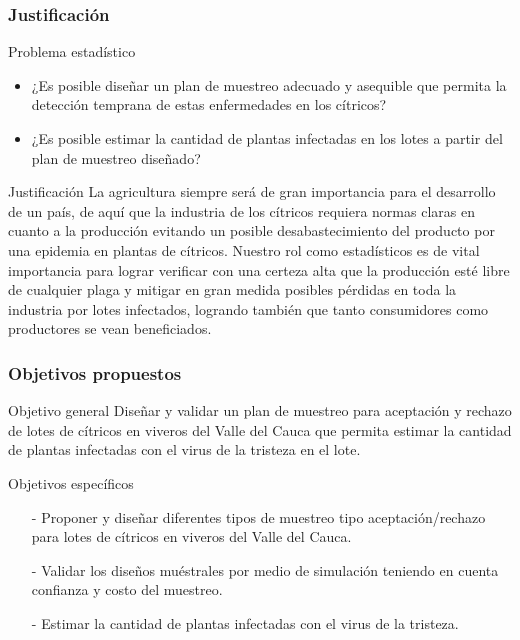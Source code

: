\documentclass[10.5pt]{beamer}
\begin{document}
\begin{frame}
\frametitle{Justificación}
\begin{block}{Problema estadístico}
\begin{itemize}
\justifying
\item ¿Es posible diseñar un plan de muestreo adecuado y asequible que permita la detección temprana de estas enfermedades en los cítricos?
\item ¿Es posible estimar la cantidad de plantas infectadas en los lotes a partir del plan de muestreo diseñado?
\end{itemize}
\end{block}
\begin{block}{Justificación}
\justifying
La agricultura siempre será de gran importancia para el desarrollo de un país, de aquí que la industria de los cítricos requiera normas claras en cuanto a la producción evitando un posible desabastecimiento del producto por una epidemia en plantas de cítricos. Nuestro rol como estadísticos es de vital importancia para lograr verificar con una certeza alta que la producción esté libre de cualquier plaga y mitigar en gran medida posibles pérdidas en toda la industria por lotes infectados, logrando también que tanto consumidores como productores se vean beneficiados.
\end{block}
\end{frame}

\begin{frame}
\frametitle{Objetivos propuestos}
\begin{block}{Objetivo general}
Diseñar y validar un plan de muestreo para aceptación y rechazo de lotes de cítricos en viveros del Valle del Cauca que permita estimar la cantidad de plantas infectadas con el virus de la tristeza en el lote.
\end{block}
\begin{block}{Objetivos específicos}
\begin{itemize}
\justifying
\item[-]Proponer y diseñar diferentes tipos de muestreo tipo aceptación/rechazo para lotes de cítricos en viveros del Valle del Cauca.
\item[-]Validar los diseños muéstrales por medio de simulación teniendo en cuenta confianza y costo del muestreo.
\item[-]Estimar la cantidad de plantas infectadas con el virus de la tristeza.
\end{itemize}
\end{block}
\end{frame}
\end{document}
